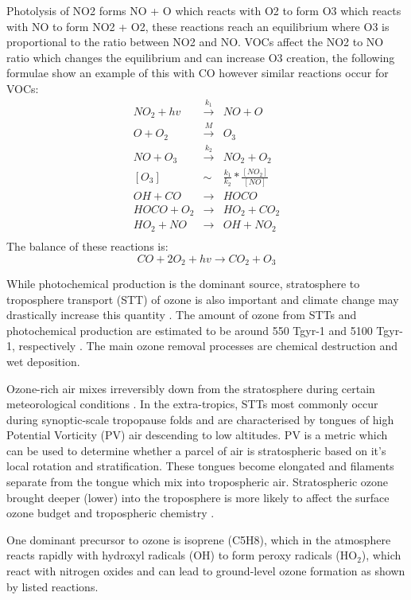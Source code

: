 Photolysis of NO2 forms NO + O which reacts with O2 to form O3 which reacts with NO to form NO2 + O2, these reactions reach an equilibrium where O3 is proportional to the ratio between NO2 and NO.
VOCs affect the NO2 to NO ratio which changes the equilibrium and can increase O3 creation, the following formulae show an example of this with CO however similar reactions occur for VOCs:
\begin{eqnarray*}
NO_2 + hv &\overset{k_1}{\rightarrow}& NO + O \\
O + O_2 &\overset{M}{\rightarrow}& O_3 \\
NO + O_3 &\overset{k_2}{\rightarrow}& NO_2 + O_2 \\
[O_3] &\sim& \frac{k_1}{k_2} * \frac{[NO_2]}{[NO]} \\
OH + CO &{\rightarrow}& HOCO \\
HOCO + O_2 &{\rightarrow}& HO_2 + CO_2 \\
HO_2 + NO &{\rightarrow}& OH + NO_2 \\
\end{eqnarray*}
The balance of these reactions is:
$$ CO + 2O_2 + hv {\rightarrow} CO_2 + O_3 $$

While photochemical production is the dominant source, stratosphere to troposphere transport (STT) of ozone is also important and climate change may drastically increase this quantity \cite{Hegglin_2009}.
The amount of ozone from STTs and photochemical production are estimated to be around 550 Tgyr-1 and 5100 Tgyr-1, respectively \cite{Stevenson_2006}. 
The main ozone removal processes are chemical destruction and wet deposition.

Ozone-rich air mixes irreversibly down from the stratosphere during certain meteorological conditions \citep{Sprenger2003,Mihalikova2012}.
In the extra-tropics, STTs most commonly occur during synoptic-scale tropopause folds \citep{Sprenger2003} and are characterised by tongues of high Potential Vorticity (PV) air descending to low altitudes.
PV is a metric which can be used to determine whether a parcel of air is stratospheric based on it's local rotation and stratification.
These tongues become elongated and filaments separate from the tongue which mix into tropospheric air.
Stratospheric ozone brought deeper (lower) into the troposphere is more likely to affect the surface ozone budget and tropospheric chemistry \citep{Zanis2003,Langford_2009}.

One dominant precursor to ozone is isoprene (C5H8), which in the atmosphere reacts rapidly with hydroxyl radicals (OH) to form peroxy radicals (HO$_2$), which react with nitrogen oxides and can lead to ground-level ozone formation as shown by listed reactions.

  